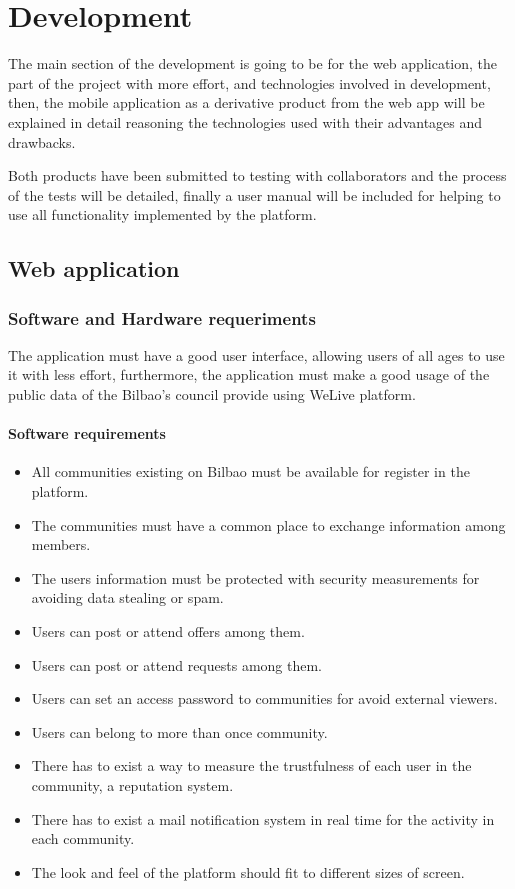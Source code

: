 \documentclass{DeustoFDP}
\begin{document}
\chapter{Development}\label{cha:development}
The main section of the development is going to be for the web application, the part of the project with more effort, and technologies involved in development, then, the mobile application as a derivative product from the web app will be explained in detail reasoning the technologies used with their advantages and drawbacks.

Both products have been submitted to testing with collaborators and the process of the tests will be detailed, finally a user manual will be included for helping to use all functionality implemented by the platform.
\section{Web application}
\subsection{Software and Hardware requeriments}
The application must have a good user interface, allowing users of all ages to use it with less effort, furthermore, the application must make a good usage of the public data of the Bilbao's council provide using WeLive platform.

\subsubsection{Software requirements}
\begin{itemize}
	\item All communities existing on Bilbao must be available for register in the platform.
	\item The communities must have a common place to exchange information among members.
	\item The users information must be protected with security measurements for avoiding data stealing or spam.
	\item Users can post or attend offers among them.
	\item Users can post or attend requests among them.
	\item Users can set an access password to communities for avoid external viewers.
	\item Users can belong to more than once community.
	\item There has to exist a way to measure the trustfulness of each user in the community, a reputation system.
	\item There has to exist a mail notification system in real time for the activity in each community.
	\item The look and feel of the platform should fit to different sizes of screen.
\end{itemize}
\end{document}
